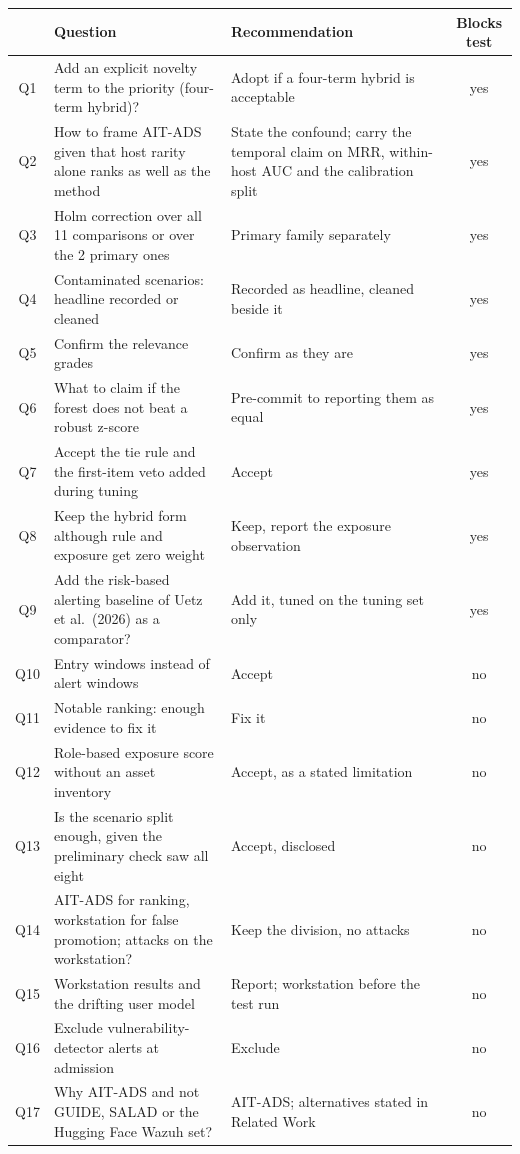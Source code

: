 \documentclass[10.5pt,a4paper]{article}
\begin{document}
\begin{table}[h]
\centering\small
\begin{tabularx}{\linewidth}{@{}c X X c@{}}
\toprule
& \textbf{Question} & \textbf{Recommendation} & \textbf{Blocks test} \\
\midrule
Q1 & Add an explicit novelty term to the priority (four-term hybrid)? & Adopt if a four-term hybrid is acceptable & yes \\
Q2 & How to frame AIT-ADS given that host rarity alone ranks as well as the method & State the confound; carry the temporal claim on MRR, within-host AUC and the calibration split & yes \\
Q3 & Holm correction over all 11 comparisons or over the 2 primary ones & Primary family separately & yes \\
Q4 & Contaminated scenarios: headline recorded or cleaned & Recorded as headline, cleaned beside it & yes \\
Q5 & Confirm the relevance grades & Confirm as they are & yes \\
Q6 & What to claim if the forest does not beat a robust z-score & Pre-commit to reporting them as equal & yes \\
Q7 & Accept the tie rule and the first-item veto added during tuning & Accept & yes \\
Q8 & Keep the hybrid form although rule and exposure get zero weight & Keep, report the exposure observation & yes \\
Q9 & Add the risk-based alerting baseline of Uetz et al.\ (2026) as a comparator? & Add it, tuned on the tuning set only & yes \\
\midrule
Q10 & Entry windows instead of alert windows & Accept & no \\
Q11 & Notable ranking: enough evidence to fix it & Fix it & no \\
Q12 & Role-based exposure score without an asset inventory & Accept, as a stated limitation & no \\
Q13 & Is the scenario split enough, given the preliminary check saw all eight & Accept, disclosed & no \\
Q14 & AIT-ADS for ranking, workstation for false promotion; attacks on the workstation? & Keep the division, no attacks & no \\
Q15 & Workstation results and the drifting user model & Report; workstation before the test run & no \\
Q16 & Exclude vulnerability-detector alerts at admission & Exclude & no \\
Q17 & Why AIT-ADS and not GUIDE, SALAD or the Hugging Face Wazuh set? & AIT-ADS; alternatives stated in Related Work & no \\
\bottomrule
\end{tabularx}
\end{table}
\end{document}
